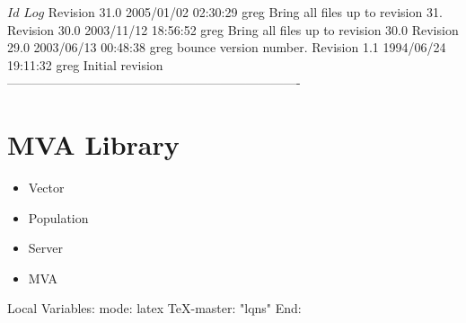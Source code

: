 \C 
\C $Id$
\C 
\C $Log$
\C Revision 31.0  2005/01/02 02:30:29  greg
\C Bring all files up to revision 31.
\C
\C Revision 30.0  2003/11/12 18:56:52  greg
\C Bring all files up to revision 30.0
\C
\C Revision 29.0  2003/06/13 00:48:38  greg
\C bounce version number.
\C
\C Revision 1.1  1994/06/24 19:11:32  greg
\C Initial revision
\C
\C
\C ----------------------------------------------------------------------
\chapter{MVA Library}

\begin{iftex}
\begin{itemize}
\item Vector
\item Population
\item Server
\item MVA
\end{itemize}
\end{iftex}





\C Local Variables: 
\C mode: latex
\C TeX-master: "lqns"
\C End: 

